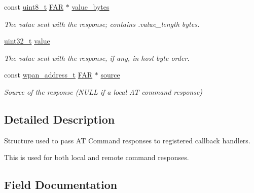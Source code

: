 \begin{DoxyCompactItemize}
const \hyperlink{group__hal__dos_gae1affc9ca37cfb624959c866a73f83c2}{uint8\+\_\+t} \hyperlink{group__hal_gaef060b3456fdcc093a7210a762d5f2ed}{F\+AR} $\ast$ \hyperlink{structxbee__cmd__response__t_af6bfa5858cb10700bab8337ebdd26561}{value\+\_\+bytes}
\begin{DoxyCompactList}\small\item\em The value sent with the response; contains .value\+\_\+length bytes. \end{DoxyCompactList}\item 
\hyperlink{group__hal__dos_ga09a1e304d66d35dd47daffee9731edaa}{uint32\+\_\+t} \hyperlink{structxbee__cmd__response__t_ae7f66047e6e39ba2bb6af8b95f00d1dd}{value}
\begin{DoxyCompactList}\small\item\em The value sent with the response, if any, in host byte order. \end{DoxyCompactList}\item 
\mbox{\label{structxbee__cmd__response__t_a1f8f524e73e197c24aef4fad585173b9}} 
const \hyperlink{structwpan__address__t}{wpan\+\_\+address\+\_\+t} \hyperlink{group__hal_gaef060b3456fdcc093a7210a762d5f2ed}{F\+AR} $\ast$ \hyperlink{structxbee__cmd__response__t_a1f8f524e73e197c24aef4fad585173b9}{source}
\begin{DoxyCompactList}\small\item\em Source of the response (N\+U\+LL if a local AT command response) \end{DoxyCompactList}\end{DoxyCompactItemize}


\subsection{Detailed Description}
Structure used to pass AT Command responses to registered callback handlers. 

This is used for both local and remote command responses. 

\subsection{Field Documentation}
\mbox{\label{structxbee__cmd__response__t_aa1e66c60bb56acaced6ca2646fd44616}} 
